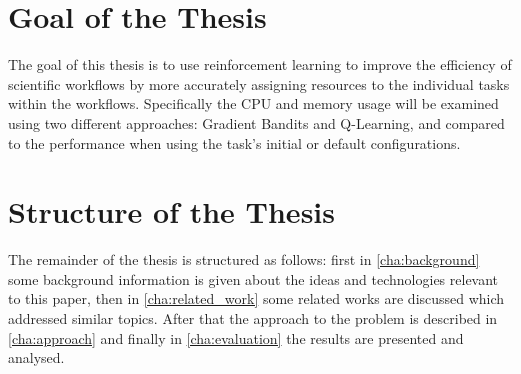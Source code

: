 
\section{Goal of the Thesis}
\label{sec:goal}

The goal of this thesis is to use reinforcement learning to improve the efficiency of scientific workflows by more accurately assigning resources to the individual tasks within the workflows. Specifically the CPU and memory usage will be examined using two different approaches: Gradient Bandits and Q-Learning, and compared to the performance when using the task's initial or default configurations.

\section{Structure of the Thesis}
\label{sec:structure}

The remainder of the thesis is structured as follows: first in \ref{cha:background} some background information is given about the ideas and technologies relevant to this paper, then in \ref{cha:related_work} some related works are discussed which addressed similar topics. After that the approach to the problem is described in \ref{cha:approach} and finally in \ref{cha:evaluation} the results are presented and analysed.
